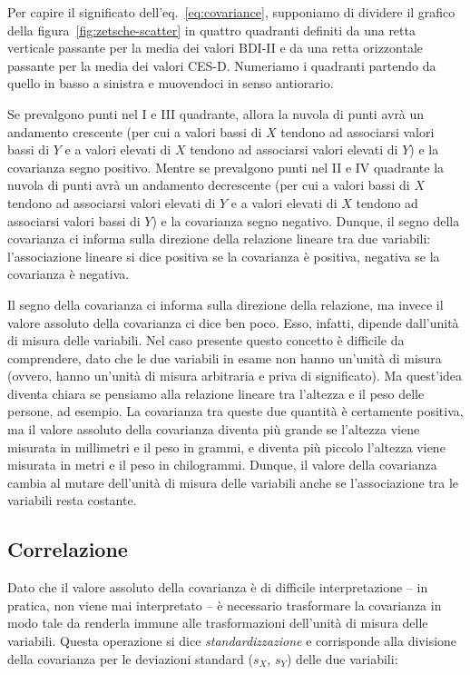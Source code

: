 \documentclass[
  11pt,
  italian,
  a4paper,
  extrafontsizes,onecolumn,openright
  ]{memoir}
\theoremstyle{definition}
\theoremstyle{definition}
\theoremstyle{definition}
\theoremstyle{definition}
\theoremstyle{remark}
\begin{document}
Per capire il significato dell'eq.~\eqref{eq:covariance}, supponiamo di dividere il grafico della figura~\ref{fig:zetsche-scatter} in quattro quadranti definiti da una retta verticale passante per la media dei valori BDI-II e da una retta orizzontale passante per la media dei valori CES-D. Numeriamo i quadranti partendo da quello in basso a sinistra e muovendoci in senso antiorario.

Se prevalgono punti nel I e III quadrante, allora la nuvola di punti
avrà un andamento crescente (per cui a valori bassi di \(X\) tendono ad
associarsi valori bassi di \(Y\) e a valori elevati di \(X\) tendono ad
associarsi valori elevati di \(Y\)) e la covarianza segno positivo. Mentre
se prevalgono punti nel II e IV quadrante la nuvola di punti avrà un
andamento decrescente (per cui a valori bassi di \(X\) tendono ad
associarsi valori elevati di \(Y\) e a valori elevati di \(X\) tendono ad
associarsi valori bassi di \(Y\)) e la covarianza segno negativo. Dunque,
il segno della covarianza ci informa sulla direzione della relazione
lineare tra due variabili: l'associazione lineare si dice positiva se la
covarianza è positiva, negativa se la covarianza è negativa.

Il segno della covarianza ci informa sulla direzione della relazione, ma
invece il valore assoluto della covarianza ci dice ben poco. Esso,
infatti, dipende dall'unità di misura delle variabili. Nel caso presente
questo concetto è difficile da comprendere, dato che le due variabili in
esame non hanno un'unità di misura (ovvero, hanno un'unità di misura
arbitraria e priva di significato). Ma quest'idea diventa chiara se
pensiamo alla relazione lineare tra l'altezza e il peso delle persone,
ad esempio. La covarianza tra queste due quantità è certamente positiva,
ma il valore assoluto della covarianza diventa più grande se l'altezza
viene misurata in millimetri e il peso in grammi, e diventa più piccolo
l'altezza viene misurata in metri e il peso in chilogrammi. Dunque, il
valore della covarianza cambia al mutare dell'unità di misura delle
variabili anche se l'associazione tra le variabili resta costante.

\hypertarget{correlazione}{%
\subsection{Correlazione}\label{correlazione}}

Dato che il valore assoluto della covarianza è di difficile
interpretazione -- in pratica, non viene mai interpretato -- è
necessario trasformare la covarianza in modo tale da renderla immune
alle trasformazioni dell'unità di misura delle variabili. Questa
operazione si dice \emph{standardizzazione} e corrisponde alla divisione
della covarianza per le deviazioni standard (\(s_X\), \(s_Y\)) delle due
variabili:
\end{document}
